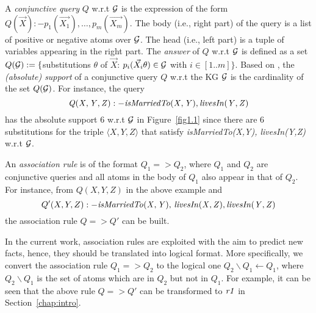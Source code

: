 A \emph{conjunctive query} $Q$ w.r.t $\mathcal{G}$ is the expression of the form $Q(\vec{X}):-p_1(\vec{X_1}),\dotsc,p_m(\vec{X_m})$. The body (i.e., right part) of the query is a list of positive or negative atoms over $\mathcal{G}$. The head (i.e., left part) is a tuple of variables appearing in the right part. The \emph{answer} of $Q$ w.r.t $\mathcal{G}$ is defined as a set $Q(\mathcal{G}):=\{$substitutions $\theta$ of $\vec{X}$: $p_i(\vec{X_i}\theta) \in \mathcal{G}$ with $i \in [1..m]\}$. Based on \cite{ref53}, the \emph{(absolute) support} of a conjunctive query $Q$ w.r.t the KG $\mathcal{G}$ is the cardinality of the set $Q(\mathcal{G})$. For instance, the query
\begin{equation}\mathit{Q(X,Y,Z):-isMarriedTo(X,Y),\, }\mathit{livesIn(Y,Z)}
\end{equation}
has the absolute support $6$ w.r.t $\mathcal{G}$ in Figure~\ref{fig1.1} since there are $6$ substitutions for the triple $\langle X, Y, Z \rangle$ that satisfy \textit{isMarriedTo(X,Y), livesIn(Y,Z)} w.r.t $\mathcal{G}$.

An \emph{association rule} is of the format $Q_1 => Q_2$, where $Q_1$ and $Q_2$ are conjunctive queries and all atoms in the body of $Q_1$ also appear in that of $Q_2$. For instance, from $Q(X,Y,Z)$ in the above example and
\begin{equation}Q'(X,Y,Z):-\mathit{isMarriedTo(X,Y),\,livesIn(X,Z),\,} \mathit{livesIn(Y,Z)}
\end{equation} the association rule $Q => Q'$ can be built.

In the current work, association rules are exploited with the aim to predict new facts, hence, they should be translated into logical format. More specifically, we convert the association rule $Q_1=>Q_2$ to the logical one $Q_2\backslash Q_1 \leftarrow Q_1$, where $Q_2 \backslash Q_1$ is the set of atoms which are in $Q_2$ but not in $Q_1$. For example, it can be seen that the above rule $Q=>Q'$ can be transformed to $\mathit{r1}$ in Section~\ref{chap:intro}.

